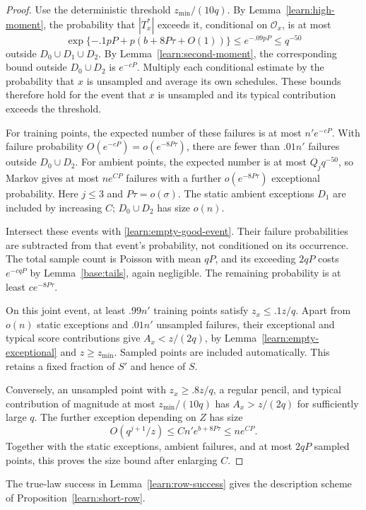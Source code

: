 \begin{proof}
Use the deterministic threshold $z_{\min}/(10q)$. By
Lemma~\ref{learn:high-moment}, the probability that
$|T_x^*|$ exceeds it, conditional on $\mathcal O_x$, is at most
\[
 \exp\{-.1pP+p(b+8P\tau+O(1))\}
 \le e^{-.09pP}\le q^{-50}
\]
outside $D_0\cup D_1\cup D_2$. By
Lemma~\ref{learn:second-moment}, the corresponding bound outside
$D_0\cup D_2$ is $e^{-cP}$. Multiply each conditional estimate by
the probability that $x$ is unsampled and average its own schedules.
These bounds therefore hold for the event that $x$ is unsampled and
its typical contribution exceeds the threshold.

For training points, the expected number of these failures is at most
$n'e^{-cP}$. With failure probability $O(e^{-cP})=o(e^{-8P\tau})$,
there are fewer than $.01n'$ failures outside $D_0\cup D_2$.
For ambient points, the expected number is at most $Q_jq^{-50}$,
so Markov gives at most $n e^{CP}$ failures with a further
$o(e^{-8P\tau})$ exceptional probability. Here $j\le3$ and
$P\tau=o(\sigma)$. The static ambient exceptions $D_1$ are included
by increasing $C$; $D_0\cup D_2$ has size $o(n)$.

Intersect these events with \eqref{learn:empty-good-event}.
Their failure probabilities are subtracted from that event's probability,
not conditioned on its occurrence. The total sample count is Poisson
with mean $qP$, and its exceeding $2qP$ costs $e^{-cqP}$ by
Lemma~\ref{base:tails}, again negligible. The remaining probability
is at least $c e^{-8P\tau}$.

On this joint event, at least $.99n'$ training points satisfy
$z_x\le .1z/q$. Apart from $o(n)$ static exceptions and $.01n'$
unsampled failures, their exceptional and typical score contributions
give $A_x<z/(2q)$, by Lemma~\ref{learn:empty-exceptional} and
$z\ge z_{\min}$. Sampled points are included automatically. This
retains a fixed fraction of $S'$ and hence of $S$.

Conversely, an unsampled point with $z_x\ge .8z/q$, a regular pencil,
and typical contribution of magnitude at most $z_{\min}/(10q)$
has $A_x>z/(2q)$ for sufficiently large $q$. The further exception
depending on $Z$ has size
\[
 O(q^{j+1}/z)\le Cn'e^{b+8P\tau}\le n e^{CP}.
\]
Together with the static exceptions, ambient failures, and at most
$2qP$ sampled points, this proves the size bound after enlarging $C$.
\end{proof}

\begin{lemma}\label{learn:implementation}
The true-law success in Lemma~\ref{learn:row-success} gives the
description scheme of Proposition~\ref{learn:short-row}.
\end{lemma}

